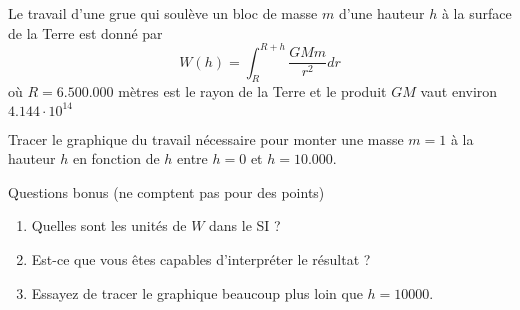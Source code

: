 \begin{exercice}\label{exotestMAT1151-G220002}

	Le travail d'une grue qui soulève un bloc de masse $m$ d'une hauteur $h$ à la surface de la Terre est donné par
	\begin{equation}
		W(h)=\int_{R}^{R+h}\frac{ GM m }{ r^2 }dr
	\end{equation}
	où $R=6.500.000$ mètres est le rayon de la Terre et le produit $GM$ vaut environ $4.144\cdot 10^{14}$

	Tracer le graphique du travail nécessaire pour monter une masse $m=1$ à la hauteur $h$ en fonction de $h$ entre $h=0$ et $h=10.000$. 

	\vspace{1cm}
Questions bonus (ne comptent pas pour des points)
\begin{enumerate}

	\item
		Quelles sont les unités de $W$ dans le SI ?
	\item
		Est-ce que vous êtes capables d'interpréter le résultat ?
	\item
		Essayez de tracer le graphique beaucoup plus loin que $h=10000$.
		

\end{enumerate}

\end{exercice}
